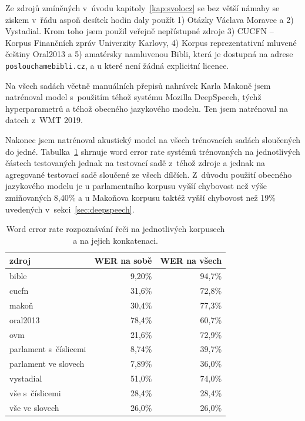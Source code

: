 Ze zdrojů zmíněných v~úvodu kapitoly~\ref{kap:svolocz} se bez větší námahy se ziskem v~řádu
aspoň desítek hodin daly použít 1) Otázky Václava Moravce a 2) Vystadial. Krom
toho jsem použil veřejně nepřístupné zdroje 3) CUCFN -- Korpus Finančních zpráv
Univerzity Karlovy, 4) Korpus reprezentativní mluvené češtiny
Oral2013\cite{oral2013} a 5) amatérsky namluvenou Bibli, která je dostupná na adrese
\texttt{poslouchamebibli.cz}, a u které není žádná explicitní licence.

Na všech sadách včetně manuálních přepisů nahrávek Karla Makoně jsem natrénoval
model s~použitím téhož systému Mozilla DeepSpeech, týchž hyperparametrů a téhož
obecného jazykového modelu. Ten jsem natrénoval na datech z~WMT
2019\cite{wmt19}.

Nakonec jsem natrénoval akustický model na všech trénovacích
sadách sloučených do jedné.
Tabulka~\ref{tab:csasr:results} shrnuje word error rate systémů trénovaných na
jednotlivých částech testovaných jednak na testovací sadě z~téhož zdroje a
jednak na agregované testovací sadě sloučené ze všech dílčích.
Z~důvodu použití obecného jazykového modelu je u parlamentního korpusu vyšší chybovost než
výše zmiňovaných 8,40\% a u Makoňova korpusu taktéž vyšší chybovost než 19\%
uvedených v~sekci~\ref{sec:deepspeech}.

\begin{table}[htpb]
\begin{center}
\begin{tabular}{|l||r|r|}
\hline
zdroj     & WER na sobě & WER na všech \\
\hline
bible     & 9,20\%  & 94,7\% \\
cucfn     & 31,6\%  & 72,8\% \\
makoň     & 30,4\%  & 77,3\% \\
oral2013  & 78,4\%  & 60,7\% \\
ovm       & 21,6\%  & 72,9\% \\
parlament s~číslicemi & 8,74\%  & 39,7\% \\
parlament ve slovech  & 7,89\%  & 36,0\% \\
vystadial & 51,0\%  & 74,0\% \\
\hline
vše s~číslicemi   & 28,4\%  & 28,4\% \\
vše ve slovech    & 26,0\%  & 26,0\% \\
\hline
\end{tabular}
\caption{Word error rate rozpoznávání řeči na jednotlivých korpusech a na jejich
konkatenaci.}\label{tab:csasr:results}
\end{center}
\end{table}

